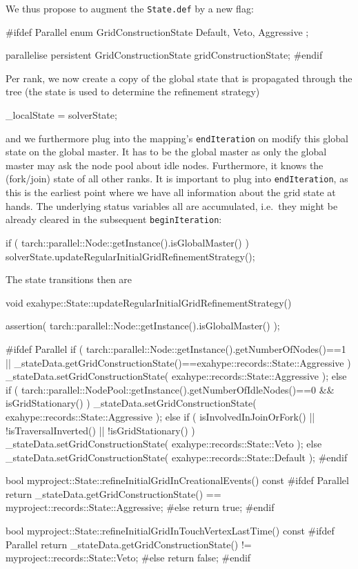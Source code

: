 We thus propose to augment the \texttt{State.def} by a new flag:
\begin{code}
  #ifdef Parallel
  enum GridConstructionState {
    Default, Veto, Aggressive
  };
  
  parallelise persistent GridConstructionState  gridConstructionState; 
  #endif
\end{code}

\noindent
Per rank, we now create a copy of the global state that is propagated through
the tree (the state is used to determine the refinement strategy)
\begin{code}
  _localState = solverState;
\end{code}

\noindent
and we furthermore plug into the mapping's \texttt{endIteration} on modify this
global state on the global master. 
It has to be the global master as only the global master may ask the node pool
about idle nodes. 
Furthermore, it knows the (fork/join) state of all other ranks.
It is important to plug into \texttt{endIteration}, as this is the earliest
point where we have all information about the grid state at hands. 
The underlying status variables all are accumulated, i.e.~they might be already
cleared in the subsequent \texttt{beginIteration}:
\begin{code}
  if ( tarch::parallel::Node::getInstance().isGlobalMaster() ) {
    solverState.updateRegularInitialGridRefinementStrategy();
  }
\end{code}

\noindent
The state transitions then are
\begin{code}
void exahype::State::updateRegularInitialGridRefinementStrategy() {
  assertion( tarch::parallel::Node::getInstance().isGlobalMaster() );

  #ifdef Parallel
  if (
    tarch::parallel::Node::getInstance().getNumberOfNodes()==1
    ||
    _stateData.getGridConstructionState()==exahype::records::State::Aggressive
  ) {
    _stateData.setGridConstructionState( exahype::records::State::Aggressive );
  }
  else if (
    tarch::parallel::NodePool::getInstance().getNumberOfIdleNodes()==0
    &&
    isGridStationary()
  ) {
    _stateData.setGridConstructionState( exahype::records::State::Aggressive );
  }
  else if (
    isInvolvedInJoinOrFork()
    ||
    !isTraversalInverted()
    ||
    !isGridStationary()
  ) {
    _stateData.setGridConstructionState( exahype::records::State::Veto );
  }
  else {
    _stateData.setGridConstructionState( exahype::records::State::Default );
  }
  #endif
}

bool myproject::State::refineInitialGridInCreationalEvents() const {
  #ifdef Parallel
  return _stateData.getGridConstructionState() == myproject::records::State::Aggressive;
  #else
  return true;
  #endif
}

bool myproject::State::refineInitialGridInTouchVertexLastTime() const {
  #ifdef Parallel
  return _stateData.getGridConstructionState() != myproject::records::State::Veto;
  #else
  return false;
  #endif
}
\end{code}

